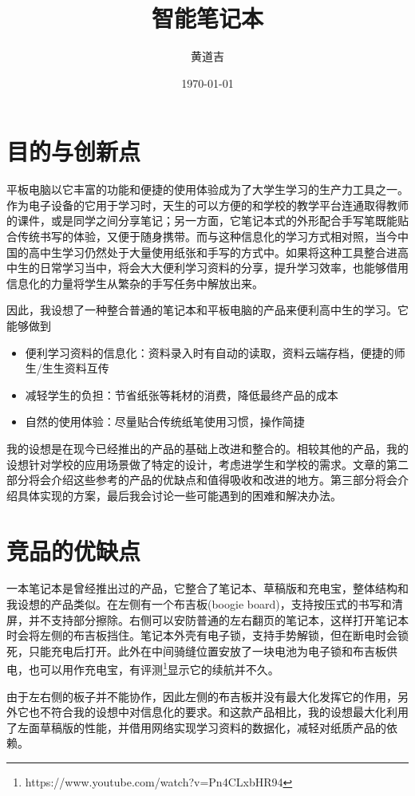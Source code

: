 \documentclass{article}
\author{黄道吉}
\title{智能笔记本}
\date{\today}
\begin{document}
\maketitle

\section{目的与创新点}


平板电脑以它丰富的功能和便捷的使用体验成为了大学生学习的生产力工具之一。作为电子设备的它用于学习时，天生的可以方便的和学校的教学平台连通取得教师的课件，或是同学之间分享笔记；另一方面，它笔记本式的外形配合手写笔既能贴合传统书写的体验，又便于随身携带。而与这种信息化的学习方式相对照，当今中国的高中生学习仍然处于大量使用纸张和手写的方式中。如果将这种工具整合进高中生的日常学习当中，将会大大便利学习资料的分享，提升学习效率，也能够借用信息化的力量将学生从繁杂的手写任务中解放出来。

因此，我设想了一种整合普通的笔记本和平板电脑的产品来便利高中生的学习。它能够做到
\begin{itemize}
    \item 便利学习资料的信息化：资料录入时有自动的读取，资料云端存档，便捷的师生/生生资料互传
    \item 减轻学生的负担：节省纸张等耗材的消费，降低最终产品的成本
    \item 自然的使用体验：尽量贴合传统纸笔使用习惯，操作简捷
\end{itemize}

我的设想是在现今已经推出的产品的基础上改进和整合的。相较其他的产品，我的设想针对学校的应用场景做了特定的设计，考虑进学生和学校的需求。文章的第二部分将会介绍这些参考的产品的优缺点和值得吸收和改进的地方。第三部分将会介绍具体实现的方案，最后我会讨论一些可能遇到的困难和解决办法。

\section{竞品的优缺点}

一本笔记本是曾经推出过的产品，它整合了笔记本、草稿版和充电宝，整体结构和我设想的产品类似。在左侧有一个布吉板(boogie board)，支持按压式的书写和清屏，并不支持部分擦除。右侧可以安防普通的左右翻页的笔记本，这样打开笔记本时会将左侧的布吉板挡住。笔记本外壳有电子锁，支持手势解锁，但在断电时会锁死，只能充电后打开。此外在中间骑缝位置安放了一块电池为电子锁和布吉板供电，也可以用作充电宝，有评测\footnote{https://www.youtube.com/watch?v=Pn4CLxbHR94}显示它的续航并不久。

由于左右侧的板子并不能协作，因此左侧的布吉板并没有最大化发挥它的作用，另外它也不符合我的设想中对信息化的要求。和这款产品相比，我的设想最大化利用了左面草稿版的性能，并借用网络实现学习资料的数据化，减轻对纸质产品的依赖。
\end{document}
